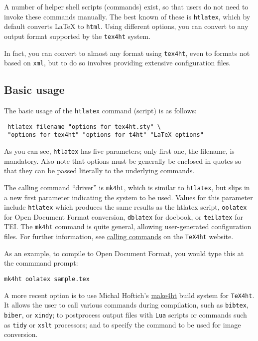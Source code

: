 A number of helper shell scripts (commands) exist, so that users do not
need to invoke these commands manually. The best known of these is
\texttt{htlatex}, which by default converts LaTeX to \texttt{html}.
Using different options, you can convert to any output format supported
by the \texttt{tex4ht} system.

In fact, you can convert to almost any format using \texttt{tex4ht},
even to formats not based on \texttt{xml}, but to do so involves
providing extensive configuration files.

\hypertarget{basic-usage}{%
\subsection{Basic usage}\label{basic-usage}}

The basic usage of the \texttt{htlatex} command (script) is as follows:

\begin{verbatim}
 htlatex filename "options for tex4ht.sty" \ 
 "options for tex4ht" "options for t4ht" "LaTeX options"
\end{verbatim}

As you can see, \texttt{htlatex} has five parameters; only first one,
the filename, is mandatory. Also note that options must be generally be
enclosed in quotes so that they can be passed literally to the
underlying commands.

The calling command ``driver'' is \texttt{mk4ht}, which is similar to
\texttt{htlatex}, but slips in a new first parameter indicating the
system to be used. Values for this parameter include \texttt{htlatex}
which produces the same results as the htlatex script, \texttt{oolatex}
for Open Document Format conversion, \texttt{dblatex} for docbook, or
\texttt{teilatex} for TEI. The \texttt{mk4ht} command is quite general,
allowing user-generated configuration files. For further information,
see
\href{https://www.tug.org/applications/tex4ht/mn-commands.html\#QQ1-9-33}{calling
commands} on the \texttt{TeX4ht} website.

As an example, to compile to Open Document Format, you would type this
at the commmand prompt:

\begin{verbatim}
mk4ht oolatex sample.tex
\end{verbatim}

A more recent option is to use Michal Hoftich's
\href{https://github.com/michal-h21/make4ht}{make4ht} build system for
\texttt{TeX4ht}. It allows the user to call various commands during
compilation, such as \texttt{bibtex}, \texttt{biber}, or \texttt{xindy};
to postprocess output files with \texttt{Lua} scripts or commands such
as \texttt{tidy} or \texttt{xslt} processors; and to specify the command
to be used for image conversion.

